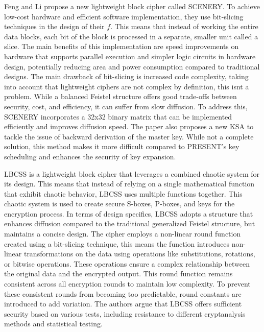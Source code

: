 \documentclass[conference]{IEEEtran}
\begin{document}
Feng and Li propose a new lightweight block cipher called SCENERY. To achieve low-cost hardware and efficient software implementation, they use bit-slicing techniques in the design of their $f$. This means that instead of working the entire data blocks, each bit of the block is processed in a separate, smaller unit called a slice. The main benefits of this implementation are speed improvements on hardware that supports parallel execution and simpler logic circuits in hardware design, potentially reducing area and power consumption compared to traditional designs. The main drawback of bit-slicing is increased code complexity, taking into account that lightweight ciphers are not complex by definition, this isnt a problem. While a balanced Feistel structure offers good trade-offs between security, cost, and efficiency, it can suffer from slow diffusion. To address this, SCENERY incorporates a 32x32 binary matrix that can be implemented efficiently and improves diffusion speed. The paper also proposes a new KSA to tackle the issue of backward derivation of the master key. While not a complete solution, this method makes it more difficult compared to PRESENT's key scheduling and enhances the security of key expansion.\cite{SCENERY}


LBCSS is a lightweight block cipher that leverages a combined chaotic system for its design. This means that instead of relying on a single mathematical function that exhibit chaotic behavior, LBCSS uses multiple functions together. This chaotic system is used to create secure S-boxes, P-boxes, and keys for the encryption process. In terms of design specifics, LBCSS adopts a structure that enhances diffusion compared to the traditional generalized Feistel structure, but maintains a concise design. The cipher employs a non-linear round function created using a bit-slicing technique, this means the function introduces non-linear transformations on the data using operations like substitutions, rotations, or bitwise operations. These operations ensure a complex relationship between the original data and the encrypted output. This round function remains consistent across all encryption rounds to maintain low complexity. To prevent these consistent rounds from becoming too predictable, round constants are introduced to add variation. The authors argue that LBCSS offers sufficient security based on various tests, including resistance to different cryptanalysis methods and statistical testing. \cite{LBCCS}
\end{document}

